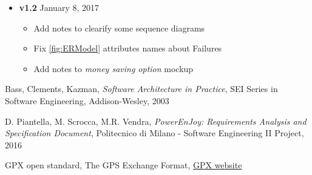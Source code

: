 \begin{appendices}
\begin{itemize}
\begin{itemize}
		\end{itemize}
		\item \textbf{v1.2} January 8, 2017
		\begin{itemize}
			\item Add notes to clearify some sequence diagrams
			\item Fix \autoref{fig:ERModel} attributes names about Failures
			\item Add notes to \emph{money saving option} mockup
		\end{itemize}
	\end{itemize}
	
\end{appendices}


\begin{thebibliography}{9}

Bass, Clements, Kazman, \emph{Software Architecture in Practice}, SEI Series in Software Engineering, Addison-­Wesley, 2003

D. Piantella, M. Scrocca, M.R. Vendra, \emph{PowerEnJoy: Requirements Analysis and Specification Document}, Politecnico di Milano - Software Engineering II Project, 2016

GPX open standard, The GPS Exchange Format, \href{http://www.topografix.com/gpx.asp}{GPX website}
\end{thebibliography}
